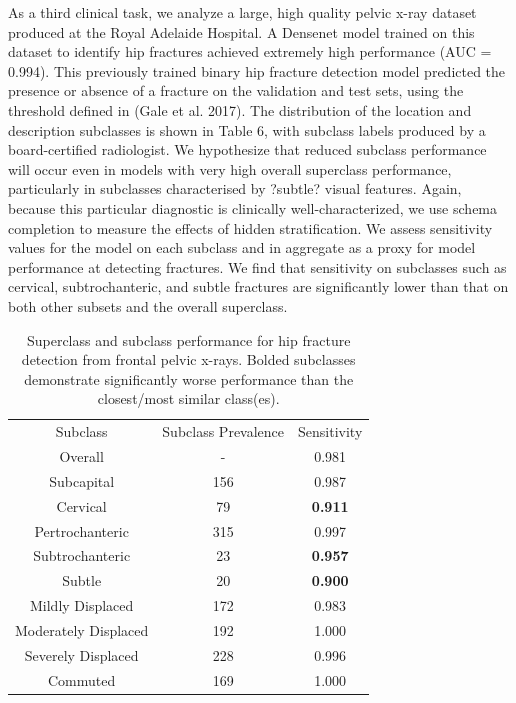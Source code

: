 \documentclass{article}
\begin{document}
As a third clinical task, we analyze a large, high quality pelvic x-ray dataset produced at the Royal Adelaide Hospital.
 A Densenet model trained on this dataset to identify hip fractures achieved extremely high performance (AUC = 0.994). 
 This previously trained binary hip fracture detection model predicted the presence or absence of a fracture on the validation and test sets, using the threshold defined in (Gale et al. 2017).  
 The distribution of the location and description subclasses is shown in Table 6, with subclass labels produced by a board-certified radiologist.  
 We hypothesize that reduced subclass performance will occur even in models with very high overall superclass performance, particularly in subclasses characterised by ?subtle? visual features.  
 Again, because this particular diagnostic is clinically well-characterized, we use schema completion to measure the effects of hidden stratification.  
 We assess sensitivity values for the model on each subclass and in aggregate as a proxy for model performance at detecting fractures.  
 We find that sensitivity on subclasses such as cervical, subtrochanteric, and subtle fractures are significantly lower than that on both other subsets and the overall superclass.  
 
\begin{table}[]
\centering
\begin{tabular}{ccc}
 Subclass & Subclass Prevalence & Sensitivity \\
 Overall & - & 0.981  \\
 Subcapital & 156 & 0.987   \\
 Cervical & 79 & \textbf{0.911}\\
 Pertrochanteric & 315  & 0.997\\
 Subtrochanteric & 23 & \textbf{0.957} \\
 Subtle & 20 & \textbf{0.900}\\
 Mildly Displaced & 172 & 0.983\\
 Moderately Displaced & 192 & 1.000\\
 Severely Displaced & 228 & 0.996\\
 Commuted & 169 & 1.000 \\ 
\end{tabular}
\label{tab:hip1}
\caption{Superclass and subclass performance for hip fracture detection from frontal pelvic x-rays. Bolded subclasses demonstrate significantly worse performance than the closest/most similar class(es).}
\end{table}
\end{document}
